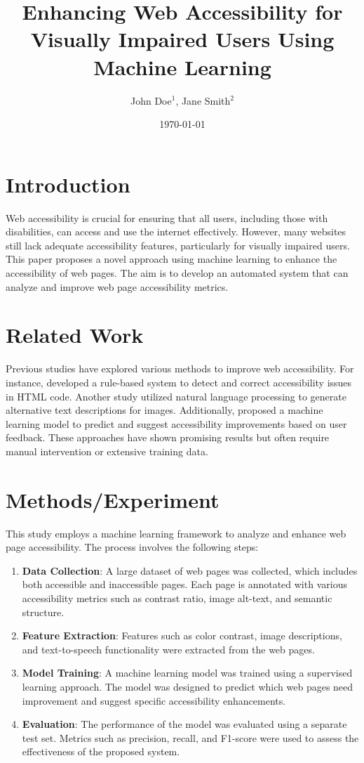 \documentclass{article}
\title{Enhancing Web Accessibility for Visually Impaired Users Using Machine Learning}
\author{John Doe$^{1}$, Jane Smith$^{2}$}
\date{\today}
\begin{document}
\maketitle

\section{Introduction}
Web accessibility is crucial for ensuring that all users, including those with disabilities, can access and use the internet effectively. However, many websites still lack adequate accessibility features, particularly for visually impaired users. This paper proposes a novel approach using machine learning to enhance the accessibility of web pages. The aim is to develop an automated system that can analyze and improve web page accessibility metrics.

\section{Related Work}
Previous studies have explored various methods to improve web accessibility. For instance, \cite{ref1} developed a rule-based system to detect and correct accessibility issues in HTML code. Another study \cite{ref2} utilized natural language processing to generate alternative text descriptions for images. Additionally, \cite{ref3} proposed a machine learning model to predict and suggest accessibility improvements based on user feedback. These approaches have shown promising results but often require manual intervention or extensive training data.

\section{Methods/Experiment}
This study employs a machine learning framework to analyze and enhance web page accessibility. The process involves the following steps:

\begin{enumerate}
    \item \textbf{Data Collection}: A large dataset of web pages was collected, which includes both accessible and inaccessible pages. Each page is annotated with various accessibility metrics such as contrast ratio, image alt-text, and semantic structure.
    \item \textbf{Feature Extraction}: Features such as color contrast, image descriptions, and text-to-speech functionality were extracted from the web pages.
    \item \textbf{Model Training}: A machine learning model was trained using a supervised learning approach. The model was designed to predict which web pages need improvement and suggest specific accessibility enhancements.
    \item \textbf{Evaluation}: The performance of the model was evaluated using a separate test set. Metrics such as precision, recall, and F1-score were used to assess the effectiveness of the proposed system.
\end{enumerate}
\end{document}
